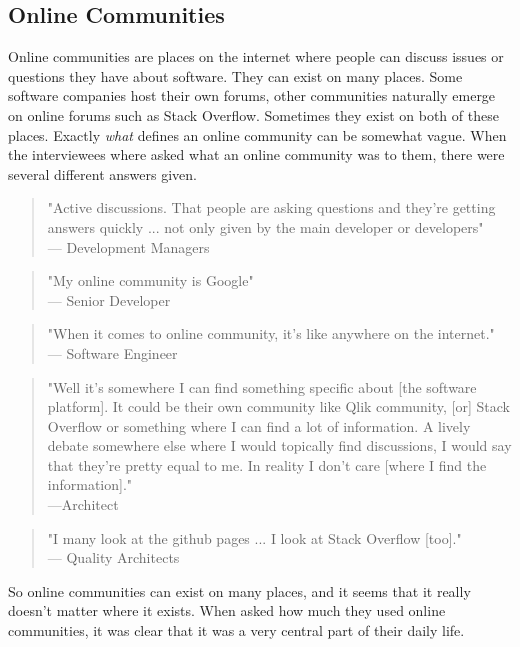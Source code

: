 \documentclass{cslthse-msc}
\begin{document}
    \subsection{Online Communities}
    Online communities are places on the internet where people can discuss issues or questions they have about software. They can exist on many places. Some software companies host their own forums, other communities naturally emerge on online forums such as Stack Overflow. Sometimes they exist on both of these places. Exactly \textit{what} defines an online community can be somewhat vague. When the interviewees where asked what an online community was to them, there were several different answers given.
    \begin{quote}
        "Active discussions. That people are asking questions and they're getting answers quickly ... not only given by the main developer or developers" \\
        --- Development Managers
    \end{quote}
    \begin{quote}
        "My online community is Google"\\
        --- Senior Developer
    \end{quote}
    \begin{quote}
        "When it comes to online community, it's like anywhere on the internet."\\
        --- Software Engineer
    \end{quote}
    \begin{quote}
        "Well it's somewhere I can find something specific about [the software platform]. It could be their own community like Qlik community, [or] Stack Overflow or something where I can find a lot of information. A lively debate somewhere else where I would topically find discussions, I would say that they're pretty equal to me. In reality I don't care [where I find the information]."
        \\---Architect
    \end{quote}
    \begin{quote}
        "I many look at the github pages ... I look at Stack Overflow [too]."\\
        --- Quality Architects
    \end{quote}
    So online communities can exist on many places, and it seems that it really doesn't matter where it exists. When asked how much they used online communities, it was clear that it was a very central part of their daily life.
\end{document}
